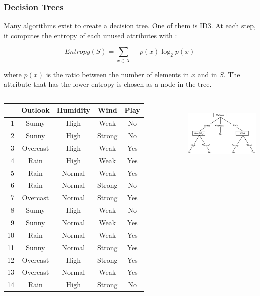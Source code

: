 \documentclass{beamer}
\begin{document}
\begin{frame}
\frametitle{Decision Trees}
  Many algorithms exist to create a decision tree. One of them is ID3. At each
  step, it computes the entropy of each unused attributes  with :

  \begin{equation*}
    Entropy(S) = \sum_{x \in X} -p(x) \log_{2}p(x)
  \end{equation*}

  where $p(x)$ is the ratio between the number of elements in $x$ and in $S$.
  The attribute that has the lower entropy is chosen as a node in the tree.

  \begin{columns}
    \begin{table}[htb]
      \centering
      \tiny
        \begin{tabular}{@{}rcccc@{}}
        \cmidrule{2-5}
           & Outlook  & Humidity & Wind   & Play\\
        \midrule
        1  & Sunny    & High     & Weak   & No  \\
        2  & Sunny    & High     & Strong & No  \\
        3  & Overcast & High     & Weak   & Yes \\
        4  & Rain     & High     & Weak   & Yes \\
        5  & Rain     & Normal   & Weak   & Yes \\
        6  & Rain     & Normal   & Strong & No  \\
        7  & Overcast & Normal   & Strong & Yes \\
        8  & Sunny    & High     & Weak   & No  \\
        9  & Sunny    & Normal   & Weak   & Yes \\
        10 & Rain     & Normal   & Weak   & Yes \\
        11 & Sunny    & Normal   & Strong & Yes \\
        12 & Overcast & High     & Strong & Yes \\
        13 & Overcast & Normal   & Weak   & Yes \\
        14 & Rain     & High     & Strong & No  \\
        \bottomrule
      \end{tabular}
      \normalsize
    \end{table}

      \centering
      \includegraphics[height=3.2cm]{img/id3.png}
  \end{columns}
\end{frame}
\end{document}
